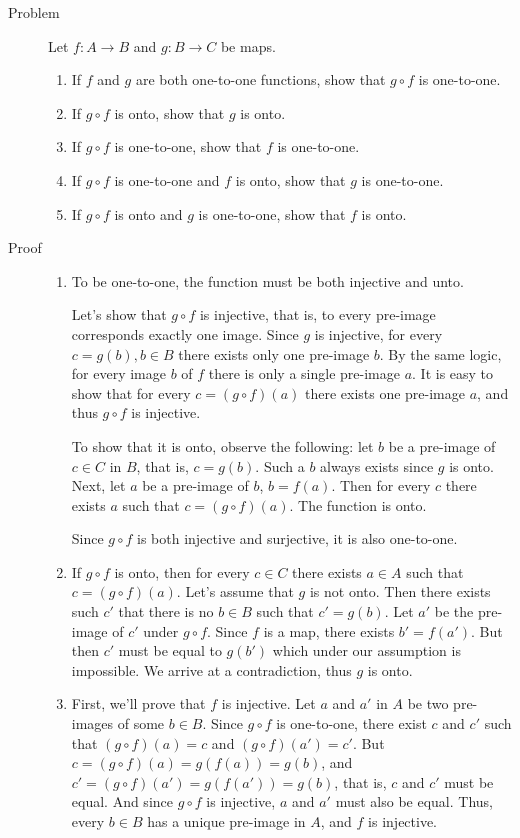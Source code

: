 \begin{description}
\item[Problem] Let $f : A \rightarrow B$ and $g : B \rightarrow C$ be maps.
\begin{enumerate}
\item If $f$ and $g$ are both one-to-one functions, show that $g \circ f$ is
one-to-one.
\item If $g \circ f$ is onto, show that $g$ is onto.
\item If $g \circ f$ is one-to-one, show that $f$ is one-to-one.
\item If $g \circ f$ is one-to-one and $f$ is onto, show that $g$ is
        one-to-one.
\item If $g \circ f$ is onto and $g$ is one-to-one, show that $f$ is onto.
\end{enumerate}
\item[Proof]
\begin{enumerate}
\item To be one-to-one, the function must be both injective and unto.

Let's show that $g \circ f$ is injective, that is, to every pre-image
corresponds exactly one image. Since $g$ is injective, for every $c = g(b), b
\in B$ there exists only one pre-image $b$. By the same logic, for every image
$b$ of $f$ there is only a single pre-image $a$. It is easy to show that for
every $c = (g \circ f)(a)$ there exists one pre-image $a$, and thus $g \circ f$
is injective.

To show that it is onto, observe the following: let $b$ be a pre-image of $c
\in C$ in $B$, that is, $c = g(b)$. Such a $b$ always exists since $g$ is
onto. Next, let $a$ be a pre-image of $b$, $b = f(a)$. Then for every $c$
there exists $a$ such that $c = (g \circ f)(a)$. The function is onto.

Since $g \circ f$ is both injective and surjective, it is also one-to-one.

\item If $g \circ f$ is onto, then for every $c \in C$ there exists $a \in A$
such that $c = (g \circ f)(a)$. Let's assume that $g$ is not onto. Then there
exists such $c'$ that there is no $b \in B$ such that $c' = g(b)$. Let $a'$ be
the pre-image of $c'$ under $g \circ f$. Since $f$ is a map, there exists
$b' = f(a')$. But then $c'$ must be equal to $g(b')$ which under our assumption
is impossible. We arrive at a contradiction, thus $g$ is onto.

\item First, we'll prove that $f$ is injective. Let $a$ and $a'$ in $A$ be two
pre-images of some $b \in B$. Since $g \circ f$ is one-to-one, there exist $c$
and $c'$ such that $(g \circ f)(a) = c$ and $(g \circ f)(a') = c'$. But $c = (g
\circ f)(a) = g(f(a)) = g(b)$, and $c' = (g \circ f)(a') = g(f(a')) = g(b)$,
that is, $c$ and $c'$ must be equal.  And since $g \circ f$ is injective, $a$
and $a'$ must also be equal. Thus, every $b \in B$ has a unique pre-image in
$A$, and $f$ is injective.  


\end{enumerate}
\end{description}
